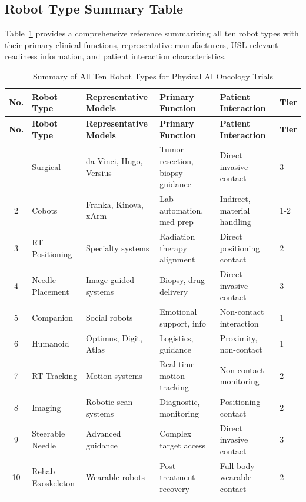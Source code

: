 \subsection{Robot Type Summary Table}
\label{subsec:instructions-summary-table}

Table~\ref{tab:robot-summary} provides a comprehensive reference summarizing all
ten robot types with their primary clinical functions, representative
manufacturers, USL-relevant readiness information, and patient interaction
characteristics.

\begin{longtable}{c >{\raggedright\arraybackslash}p{2.5cm} >{\raggedright\arraybackslash}p{3.25cm} >{\raggedright\arraybackslash}p{3.25cm} p{4cm} l}
\caption{Summary of All Ten Robot Types for Physical AI Oncology Trials}
\label{tab:robot-summary} \\
\toprule
\textbf{No.} & \textbf{Robot Type} & \textbf{Representative Models} & \textbf{Primary Function} & \textbf{Patient Interaction} & \textbf{Tier} \\
\midrule
\endfirsthead
\toprule
\textbf{No.} & \textbf{Robot Type} & \textbf{Representative Models} & \textbf{Primary Function} & \textbf{Patient Interaction} & \textbf{Tier} \\
\midrule
\endhead
\bottomrule
\endfoot
1 & Surgical & da Vinci, Hugo, Versius & Tumor resection, biopsy guidance & Direct invasive contact & 3 \\
2 & Cobots & Franka, Kinova, xArm & Lab automation, med prep & Indirect, material handling & 1-2 \\
3 & RT Positioning & Specialty systems & Radiation therapy alignment & Direct positioning contact & 2 \\
4 & Needle-Placement & Image-guided systems & Biopsy, drug delivery & Direct invasive contact & 3 \\
5 & Companion & Social robots & Emotional support, info & Non-contact interaction & 1 \\
6 & Humanoid & Optimus, Digit, Atlas & Logistics, guidance & Proximity, non-contact & 1 \\
7 & RT Tracking & Motion systems & Real-time motion tracking & Non-contact monitoring & 2 \\
8 & Imaging & Robotic scan systems & Diagnostic, monitoring & Positioning contact & 2 \\
9 & Steerable Needle & Advanced guidance & Complex target access & Direct invasive contact & 3 \\
10 & Rehab Exoskeleton & Wearable robots & Post-treatment recovery & Full-body wearable contact & 2 \\
\end{longtable}

